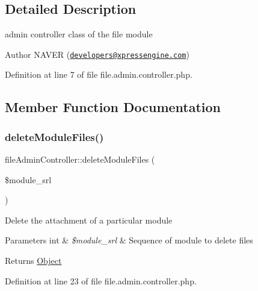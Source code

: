 \subsection{Detailed Description}
admin controller class of the file module \begin{DoxyAuthor}{Author}
N\+A\+V\+ER (\href{mailto:developers@xpressengine.com}{\tt developers@xpressengine.\+com}) 
\end{DoxyAuthor}


Definition at line 7 of file file.\+admin.\+controller.\+php.



\subsection{Member Function Documentation}
\mbox{\label{classfileAdminController_aaa637d3e043a4be10292fa2514c4f0f3}} 
\subsubsection{\texorpdfstring{delete\+Module\+Files()}{deleteModuleFiles()}}
{\footnotesize\ttfamily file\+Admin\+Controller\+::delete\+Module\+Files (\begin{DoxyParamCaption}\item[{}]{\$module\+\_\+srl }\end{DoxyParamCaption})}

Delete the attachment of a particular module


\begin{DoxyParams}[1]{Parameters}
int & {\em \$module\+\_\+srl} & Sequence of module to delete files \\
\hline
\end{DoxyParams}
\begin{DoxyReturn}{Returns}
\hyperlink{classObject}{Object} 
\end{DoxyReturn}


Definition at line 23 of file file.\+admin.\+controller.\+php.

\mbox{\label{classfileAdminController_a7926db5aa01c3f22d73c746dfc10c318}} 
